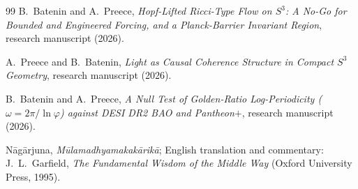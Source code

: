 \documentclass[11pt,a4paper]{article}
\theoremstyle{definition}
\theoremstyle{remark}
\newcommand{\Sthree}{S^{3}}
\begin{document}
\begin{thebibliography}{99}
B.~Batenin and A.~Preece, \emph{Hopf-Lifted Ricci-Type Flow on $\Sthree$: A No-Go for Bounded
and Engineered Forcing, and a Planck-Barrier Invariant Region}, research manuscript (2026).

A.~Preece and B.~Batenin, \emph{Light as Causal Coherence Structure in Compact $\Sthree$
Geometry}, research manuscript (2026).

B.~Batenin and A.~Preece, \emph{A Null Test of Golden-Ratio Log-Periodicity
($\omega=2\pi/\ln\varphi$) against DESI DR2 BAO and Pantheon$+$}, research manuscript (2026).

N\=ag\=arjuna, \emph{M\=ulamadhyamakak\=arik\=a}; English translation and commentary:
J.~L.~Garfield, \emph{The Fundamental Wisdom of the Middle Way} (Oxford University Press,
1995).

\end{thebibliography}
\end{document}

